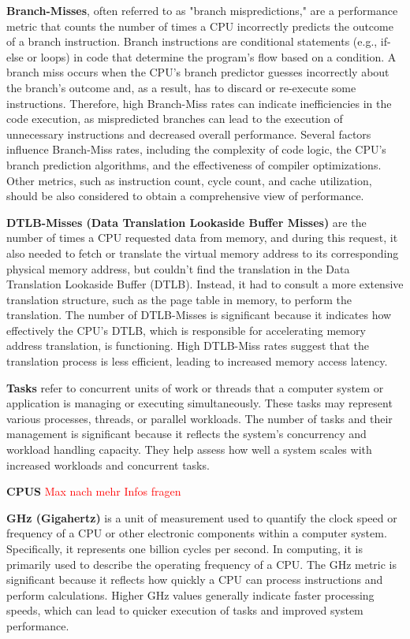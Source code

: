 \textbf{Branch-Misses}, often referred to as "branch mispredictions," are a performance metric that counts the number of times a CPU incorrectly predicts the outcome of a branch instruction. Branch instructions are conditional statements (e.g., if-else or loops) in code that determine the program's flow based on a condition. A branch miss occurs when the CPU's branch predictor guesses incorrectly about the branch's outcome and, as a result, has to discard or re-execute some instructions. Therefore, high Branch-Miss rates can indicate inefficiencies in the code execution, as mispredicted branches can lead to the execution of unnecessary instructions and decreased overall performance. Several factors influence Branch-Miss rates, including the complexity of code logic, the CPU's branch prediction algorithms, and the effectiveness of compiler optimizations. Other metrics, such as instruction count, cycle count, and cache utilization, should be also considered to obtain a comprehensive view of performance.

\textbf{DTLB-Misses (Data Translation Lookaside Buffer Misses)} are the number of times a CPU requested data from memory, and during this request, it also needed to fetch or translate the virtual memory address to its corresponding physical memory address, but couldn't find the translation in the Data Translation Lookaside Buffer (DTLB). Instead, it had to consult a more extensive translation structure, such as the page table in memory, to perform the translation. The number of DTLB-Misses is significant because it indicates how effectively the CPU's DTLB, which is responsible for accelerating memory address translation, is functioning. High DTLB-Miss rates suggest that the translation process is less efficient, leading to increased memory access latency.

\textbf{Tasks} refer to concurrent units of work or threads that a computer system or application is managing or executing simultaneously. These tasks may represent various processes, threads, or parallel workloads. The number of tasks and their management is significant because it reflects the system's concurrency and workload handling capacity. They help assess how well a system scales with increased workloads and concurrent tasks.

\textbf{CPUS} 
\textcolor{red}{Max nach mehr Infos fragen}

\textbf{GHz (Gigahertz)} is a unit of measurement used to quantify the clock speed or frequency of a CPU or other electronic components within a computer system. Specifically, it represents one billion cycles per second. In computing, it is primarily used to describe the operating frequency of a CPU. The GHz metric is significant because it reflects how quickly a CPU can process instructions and perform calculations. Higher GHz values generally indicate faster processing speeds, which can lead to quicker execution of tasks and improved system performance.

